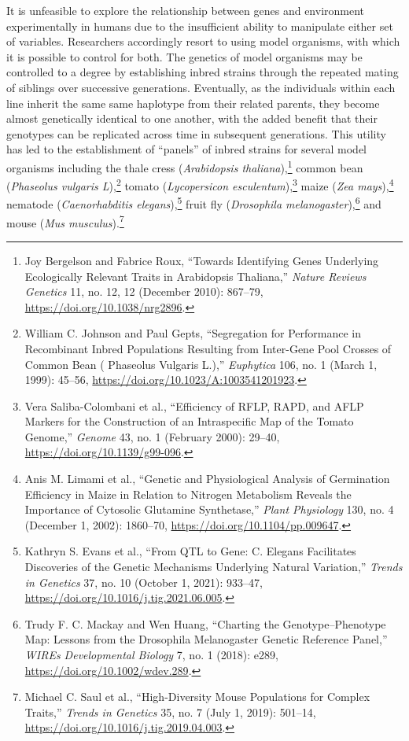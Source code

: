\documentclass[
  9pt,
]{book}
\begin{document}
It is unfeasible to explore the relationship between genes and environment experimentally in humans due to the insufficient ability to manipulate either set of variables. Researchers accordingly resort to using model organisms, with which it is possible to control for both. The genetics of model organisms may be controlled to a degree by establishing inbred strains through the repeated mating of siblings over successive generations. Eventually, as the individuals within each line inherit the same same haplotype from their related parents, they become almost genetically identical to one another, with the added benefit that their genotypes can be replicated across time in subsequent generations. This utility has led to the establishment of ``panels'' of inbred strains for several model organisms including the thale cress (\emph{Arabidopsis thaliana}),\footnote{Joy Bergelson and Fabrice Roux, {``Towards Identifying Genes Underlying Ecologically Relevant Traits in {Arabidopsis} Thaliana,''} \emph{Nature Reviews Genetics} 11, no. 12, 12 (December 2010): 867--79, \url{https://doi.org/10.1038/nrg2896}.} common bean (\emph{Phaseolus vulgaris L}),\footnote{William C. Johnson and Paul Gepts, {``Segregation for Performance in Recombinant Inbred Populations Resulting from Inter-Gene Pool Crosses of Common Bean ( {Phaseolus} Vulgaris {L}.),''} \emph{Euphytica} 106, no. 1 (March 1, 1999): 45--56, \url{https://doi.org/10.1023/A:1003541201923}.} tomato (\emph{Lycopersicon esculentum}),\footnote{Vera Saliba-Colombani et al., {``Efficiency of {RFLP}, {RAPD}, and {AFLP} Markers for the Construction of an Intraspecific Map of the Tomato Genome,''} \emph{Genome} 43, no. 1 (February 2000): 29--40, \url{https://doi.org/10.1139/g99-096}.} maize (\emph{Zea mays}),\footnote{Anis M. Limami et al., {``Genetic and {Physiological Analysis} of {Germination Efficiency} in {Maize} in {Relation} to {Nitrogen Metabolism Reveals} the {Importance} of {Cytosolic Glutamine Synthetase},''} \emph{Plant Physiology} 130, no. 4 (December 1, 2002): 1860--70, \url{https://doi.org/10.1104/pp.009647}.} nematode (\emph{Caenorhabditis elegans}),\footnote{Kathryn S. Evans et al., {``From {QTL} to Gene: {C}. Elegans Facilitates Discoveries of the Genetic Mechanisms Underlying Natural Variation,''} \emph{Trends in Genetics} 37, no. 10 (October 1, 2021): 933--47, \url{https://doi.org/10.1016/j.tig.2021.06.005}.} fruit fly (\emph{Drosophila melanogaster}),\footnote{Trudy F. C. Mackay and Wen Huang, {``Charting the Genotype--Phenotype Map: Lessons from the {Drosophila} Melanogaster {Genetic Reference Panel},''} \emph{WIREs Developmental Biology} 7, no. 1 (2018): e289, \url{https://doi.org/10.1002/wdev.289}.} and mouse (\emph{Mus musculus}).\footnote{Michael C. Saul et al., {``High-{Diversity Mouse Populations} for {Complex Traits},''} \emph{Trends in Genetics} 35, no. 7 (July 1, 2019): 501--14, \url{https://doi.org/10.1016/j.tig.2019.04.003}.}
\end{document}
